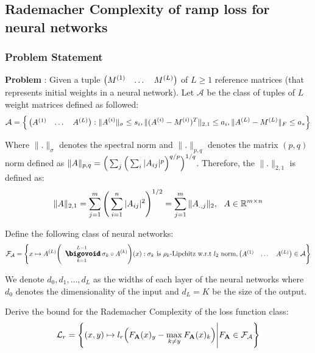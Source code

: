 \newpage
\subsection{Rademacher Complexity of ramp loss for neural networks}
\subsubsection{Problem Statement}
\label{sec:rad_complexity_of_ramp_loss_nn}
\textbf{Problem} : Given a tuple $\begin{pmatrix}M^{(1)} & \dots & M^{(L)}\end{pmatrix}$ of $L\ge 1$ reference matrices (that represents initial weights in a neural network). Let $\mathcal{A}$ be the class of tuples of $L$ weight matrices defined as followed:
\begin{align*}
    \mathcal{A} = \Big\{ 
        \begin{pmatrix}
            A^{(1)} & \dots & A^{(L)}
        \end{pmatrix} : \|A^{(i)}\|_\sigma \le s_i, \|(A^{(i)} - M^{(i)})^T\|_{2, 1}\le a_i, \|A^{(L)} - M^{(L)}\|_F \le a_*
     \Big\}
\end{align*}

\noindent Where $\|.\|_\sigma$ denotes the spectral norm and $\|.\|_{p, q}$ denotes the matrix $(p, q)$ norm defined as $\|A\|_{p, q} = \Big( \sum_j\Big( \sum_{i}|A_{ij}|^p \Big)^{q/p} \Big)^{1/q}$. Therefore, the $\|.\|_{2, 1}$ is defined as:
\begin{align*}
    \|A\|_{2, 1} = \sum_{j=1}^m \Bigg( 
        \sum_{i=1}^n |A_{ij}|^2
     \Bigg)^{1/2}
    = \sum_{j=1}^m \|A_{., j}\|_2, \ \ A\in\mathbb{R}^{m\times n}
\end{align*}

\noindent Define the following class of neural networks:
\begin{align*}
    \F_\mathcal{A} = \biggCurl{
        x\mapsto \A{L} \biggRound{
            \bigO_{k=1}^{L-1} \sigma_k \circ \A{k}
        }(x) : \sigma_k \text{ is } \rho_k\text{-Lipchitz w.r.t $l_2$ norm}, \begin{pmatrix}
            \A{1} & \dots & \A{L}
        \end{pmatrix} \in \mathcal{A}
    }
\end{align*}

\noindent We denote $d_0, d_1, \dots, d_L$ as the widths of each layer of the neural networks where $d_0$ denotes the dimensionality of the input and $d_L=K$ be the size of the output. 


\noindent Derive the bound for the Rademacher Complexity of the loss function class:
\begin{align*}
    \mathcal{L}_r = \Bigg\{ 
        (x, y) \mapsto l_r\Big( 
            F_{\bf A}(x)_y - \max_{k\ne y}F_{\bf A}(x)_k
         \Big) \Bigg| F_{\bf A} \in \mathcal{F}_\mathcal{A}
     \Bigg\}
\end{align*}

